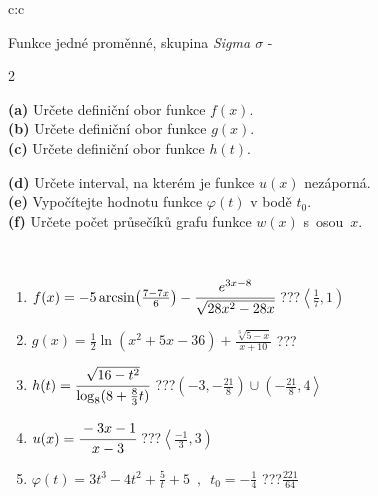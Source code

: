 \documentclass[10pt]{report}
\begin{document}
\newpage
\thispagestyle{empty}
\begin{tabular}{c:c}
\begin{minipage}[c][104.5mm][t]{0.5\linewidth}
\begin{center}
\vspace{7mm}
{\huge Funkce jedné proměnné, skupina \textit{Sigma $\sigma$} -}\\[5mm]
\begin{minipage}{0.95\linewidth}
\begin{center}
{\small \begin{multicols}{2} \raggedright
\textbf{(a)} Určete definiční obor funkce \(f(x)\). \\[1mm]
\textbf{(b)} Určete definiční obor funkce \(g(x)\). \\[1mm]
\textbf{(c)} Určete definiční obor funkce \(h(t)\). \par \columnbreak
\textbf{(d)} Určete interval, na kterém je funkce \(u(x)\) nezáporná. \\[1mm]
\textbf{(e)} Vypočítejte hodnotu funkce \(\varphi(t)\) v bodě \(t_0\). \\[1mm]
\textbf{(f)} Určete počet průsečíků grafu funkce \(w(x)\) s~osou~\(x\). \\[1mm]
\end{multicols}
}
\end{center}
\end{minipage}
\\[4mm]
\begin{minipage}{0.79\linewidth}
\begin{center}
\begin{varwidth}{\linewidth}
\begin{enumerate}
\small
\item $f(x) = -5\arcsin\!\left( \frac{7-7x}{6} \right) - \cfrac{e^{3x-8}}{\sqrt{28x^2-28x}}$\quad \dotfill\; ???\;\dotfill \quad $\left\langle\frac{1}{7} , 1\right)$
\item $g(x) = \frac{1}{2} \ln{\!(x^2+5x-36)}+\frac{\sqrt[3]{5-x}}{x+10}$\quad \dotfill\; ???\;\dotfill {}
\item $h(t) = \cfrac{\sqrt{16-t^2}}{\log_8(8+\frac{8}{3}t)}$\quad \dotfill\; ???\;\dotfill \quad $\left(-3 , -\frac{21}{8}\right)\cup\left(-\frac{21}{8} , 4\right\rangle$
\item $u(x) = \cfrac{-3x-1}{x-3}$\quad \dotfill\; ???\;\dotfill \quad $\left\langle\frac{-1}{3} , 3\right)$
\item $\varphi(t) = 3t^3-4t^2+\frac{5}{t}+5 \enspace , \enspace t_0=-\frac{1}{4}$\quad \dotfill\; ???\;\dotfill \quad $\frac{221}{64}$

\end{enumerate}
\end{varwidth}
\end{center}
\end{minipage}
\end{center}
\end{minipage}
\end{tabular}
\end{document}
